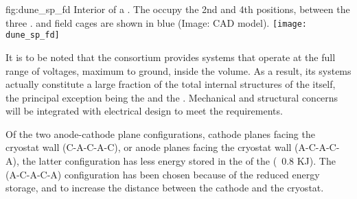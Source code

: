 \begin{dunefigure}{fig:dune_sp_fd}
{Interior of a . The  occupy the 2nd and 4th positions, between the three .   and  field cages are shown in blue (Image: CAD model).}
\texttt{[image: dune\_sp\_fd]}
\end{dunefigure}

It is to be noted that the  consortium provides systems that operate at the full range of voltages, %
maximum to ground, inside the  volume. As a result, its systems actually constitute a large fraction of the total internal structures of the  itself, the principal exception being the  and the . Mechanical and structural concerns will be integrated with electrical design to meet the requirements. 


Of the two anode-cathode plane configurations, cathode planes facing the cryostat wall (C-A-C-A-C), or anode planes facing the   
cryostat wall (A-C-A-C-A), the latter configuration has less energy stored in the \efield{} of the  (~0.8 KJ). The  (A-C-A-C-A) configuration has been chosen because of the reduced energy storage, and to increase the distance between the cathode and the cryostat.

